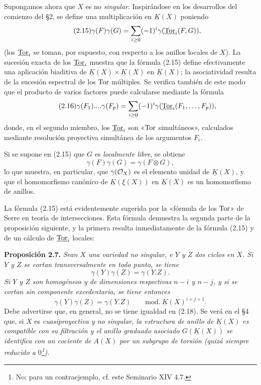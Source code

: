 Supongamos ahora que $X$ es no \emph{singular}. Inspirándose en los desarrollos del comienzo del \S 2, se define una multiplicación en $\underline{K}(X)$ poniendo
\begin{equation}\tag{2.15}
 \gamma(F)\gamma(G)=\sum_{i\geq0}(-1)^i\gamma(\underline{\operatorname{Tor}}_i(F,G)),
\end{equation}
(los $\underline{\operatorname{Tor}}_i$ se toman, por supuesto, con respecto a los anillos locales de $X$). La sucesión exacta de los $\underline{\operatorname{Tor}}_i$ muestra que la fórmula (2.15) define efectivamente una aplicación biaditiva de $\underline{K}(X)\times\underline{K}(X)$ en $\underline{K}(X)$; la asociatividad resulta de la sucesión espectral de los $\operatorname{Tor}$ múltiples. Se verifica también de este modo que el producto de varios factores puede calcularse mediante la fórmula
\begin{equation}\tag{2.16}
 \gamma(F_1)....\gamma(F_p)=\sum_{i\geq0}(-1)^i\gamma(\underline{\operatorname{Tor}}_i(F_1,\ldots,F_p)),
\end{equation}
donde, en el segundo miembro, los $\underline{\operatorname{Tor}}_i$ son «$\operatorname{Tor}$ simultáneos», calculados mediante resolución proyectiva simultánea de los argumentos $F_i$.

Si se supone en (2.15) que $G$ es \emph{localmente libre}, se obtiene
\begin{equation}\tag{2.15 bis}
 \gamma(F)\gamma(G)=\gamma(F\otimes G),
\end{equation}
lo que muestra, en particular, que $\gamma(\mathcal O_X)$ es el elemento unidad de $\underline{K}(X)$, y que el homomorfismo canónico de $\underline{K}(\xi(X))$ en $\underline{K}(X)$ es un homomorfismo de anillos.

La fórmula (2.15) está evidentemente sugerida por la «fórmula de los $\operatorname{Tor}$» de Serre en teoría de intersecciones. Esta fórmula demuestra la segunda parte de la proposición siguiente, y la primera resulta inmediatamente de la fórmula (2.15) y de un cálculo de $\underline{\operatorname{Tor}}_i$ locales:

\textbf{Proposición 2.7.} \emph{Sean $X$ una variedad no singular, e $Y$ y $Z$ dos ciclos en $X$. Si $Y$ y $Z$ se cortan transversalmente en todo punto, se tiene}
\begin{equation}\tag{2.17}
 \gamma(Y)\gamma(Z)=\gamma(Y.Z).
\end{equation}
\emph{Si $Y$ y $Z$ son homogéneos y de dimensiones respectivas $n-i$ y $n-j$, y si se cortan sin componente excedentaria, se tiene entonces}
\begin{equation}\tag{2.18}
 \gamma(Y)\gamma(Z)=\gamma(Y.Z)\qquad\mathrm{mod.}\ \underline K(X)^{i+j+1}.
\end{equation}
Debe advertirse que, en general, no se tiene igualdad en (2.18). Se verá en el \S 4 que, si $X$ es \emph{cuasiproyectiva y no singular, la estructura de anillo de $\underline K(X)$ es compatible con su filtración y el anillo graduado asociado $G(\underline K(X))$ se identifica con un cociente de $A(X)$ por un subgrupo de torsión (quizá siempre reducido a $0$\footnote{No; para un contraejemplo, cf. este Seminario XIV 4.7.})}.

